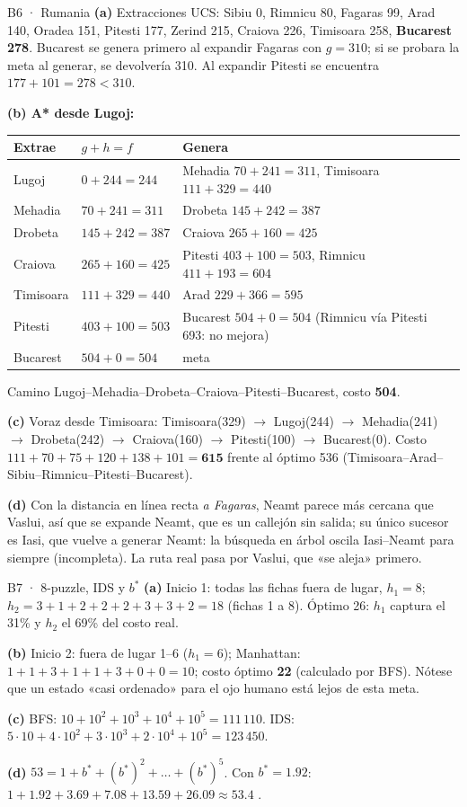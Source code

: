 \begin{solucion}{B6 · Rumania}
\textbf{(a)} Extracciones UCS: Sibiu 0, Rimnicu 80, Fagaras 99, Arad 140, Oradea 151, Pitesti 177,
Zerind 215, Craiova 226, Timisoara 258, \textbf{Bucarest 278}. Bucarest se genera primero al expandir
Fagaras con $g=310$; si se probara la meta al generar, se devolvería 310. Al expandir Pitesti se
encuentra $177+101=278<310$.

\textbf{(b) A* desde Lugoj:}
\begin{center}\small
\begin{tabular}{llll}
\toprule
Extrae & $g+h=f$ & Genera\\
\midrule
Lugoj & $0+244=244$ & Mehadia $70+241=311$, Timisoara $111+329=440$\\
Mehadia & $70+241=311$ & Drobeta $145+242=387$\\
Drobeta & $145+242=387$ & Craiova $265+160=425$\\
Craiova & $265+160=425$ & Pitesti $403+100=503$, Rimnicu $411+193=604$\\
Timisoara & $111+329=440$ & Arad $229+366=595$\\
Pitesti & $403+100=503$ & Bucarest $504+0=504$ (Rimnicu vía Pitesti 693: no mejora)\\
Bucarest & $504+0=504$ & meta\\
\bottomrule
\end{tabular}
\end{center}
Camino Lugoj–Mehadia–Drobeta–Craiova–Pitesti–Bucarest, costo \textbf{504}.

\textbf{(c)} Voraz desde Timisoara: Timisoara(329) $\to$ Lugoj(244) $\to$ Mehadia(241) $\to$ Drobeta(242)
$\to$ Craiova(160) $\to$ Pitesti(100) $\to$ Bucarest(0). Costo $111+70+75+120+138+101=\mathbf{615}$ frente
al óptimo 536 (Timisoara–Arad–Sibiu–Rimnicu–Pitesti–Bucarest).

\textbf{(d)} Con la distancia en línea recta \emph{a Fagaras}, Neamt parece más cercana que Vaslui, así que
se expande Neamt, que es un callejón sin salida; su único sucesor es Iasi, que vuelve a generar Neamt:
la búsqueda en árbol oscila Iasi–Neamt para siempre (incompleta). La ruta real pasa por Vaslui, que
«se aleja» primero.
\end{solucion}

\begin{solucion}{B7 · 8-puzzle, IDS y $b^*$}
\textbf{(a)} Inicio 1: todas las fichas fuera de lugar, $h_1=8$; $h_2=3+1+2+2+2+3+3+2=18$ (fichas 1 a 8).
Óptimo 26: $h_1$ captura el 31\% y $h_2$ el 69\% del costo real.

\textbf{(b)} Inicio 2: fuera de lugar 1–6 ($h_1=6$); Manhattan: $1+1+3+1+1+3+0+0=10$; costo óptimo \textbf{22}
(calculado por BFS). Nótese que un estado «casi ordenado» para el ojo humano está lejos de esta meta.

\textbf{(c)} BFS: $10+10^2+10^3+10^4+10^5=111\,110$. IDS: $5\cdot10+4\cdot10^2+3\cdot10^3+2\cdot10^4+10^5=123\,450$.

\textbf{(d)} $53=1+b^*+(b^*)^2+\dots+(b^*)^5$. Con $b^*=1.92$: $1+1.92+3.69+7.08+13.59+26.09\approx53.4$ \checkmark{}.
\end{solucion}

